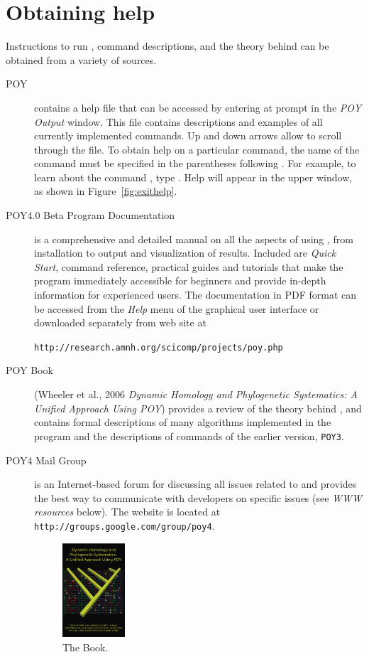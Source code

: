 \section{Obtaining help} \label{sec:help}
Instructions to run \poy, command descriptions, and the theory behind \poy can be obtained from a variety of sources.
\begin{description}
\item[POY] contains a help file that can be accessed by entering  at \poy prompt in the \emph{POY Output} window. This file contains descriptions and examples of all currently implemented \poy commands. Up and down arrows allow to scroll through the file. To obtain help on a particular command, the name of the command must be specified in the parentheses following . For example, to learn about the command , type . Help will appear in the upper window, as shown in Figure~\ref{fig:exithelp}.
\item[POY4.0 Beta Program Documentation] is a comprehensive and detailed manual on all the aspects of using \poy, from installation to output and visualization of results. Included are \emph{Quick Start}, \poy command reference, practical guides and tutorials that make the program immediately accessible for beginners and provide in-depth information for experienced users. The documentation in PDF format can be accessed from the \emph{Help} menu of the graphical user interface or downloaded separately from \poy web site at
\begin{center}
\texttt{http://research.amnh.org/scicomp/projects/poy.php}
\end{center}
\item[POY Book] (Wheeler et al., 2006 \emph{Dynamic Homology and Phylogenetic Systematics: A Unified Approach Using POY}) provides a review of the theory behind \poy, and contains formal descriptions of many algorithms implemented in the program and the descriptions of commands of the earlier version, \texttt{POY3}.
\item[POY4 Mail Group] is an Internet-based forum for discussing all issues related to \poy and provides the best way to communicate with \poy developers on specific issues (see \emph{WWW resources} below). The website is located at \texttt{http://groups.google.com/group/poy4}.
\begin{figure}[htbp]
   \centering
   \includegraphics[width=0.23\textwidth]{figures/figpoybook.jpg}
   \caption{The \poy Book.}
   \label{fig:figprocess}
\end{figure}
\end{description}

